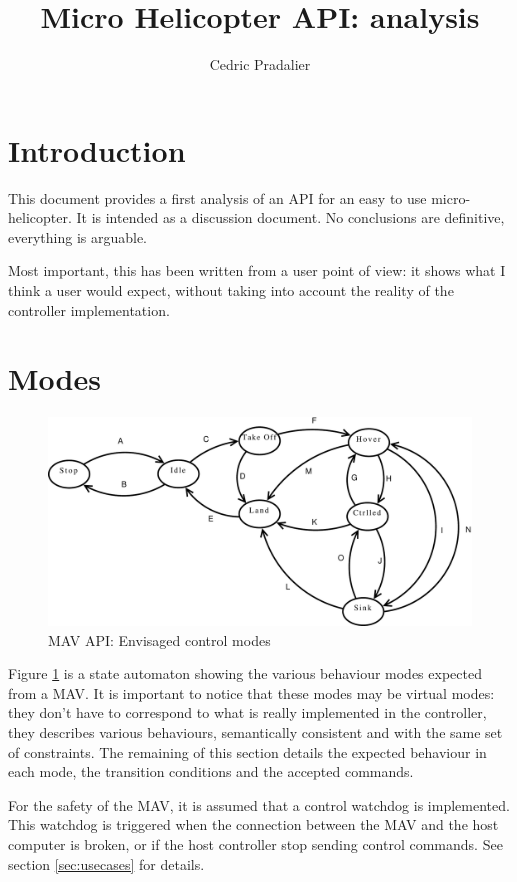 \documentclass{article}
\title{Micro Helicopter API: analysis}
\author{Cedric Pradalier}
\begin{document}
\maketitle

\section{Introduction}
\label{sec:intro}
This document provides a first analysis of an API for an easy to use
micro-helicopter. It is intended as a discussion document. No conclusions are
definitive, everything is arguable. 

Most important, this has been written from a user point of view: it shows what
I think a user would expect, without taking into account the reality of the
controller implementation. 

\section{Modes}
\label{sec:modes}
\begin{figure}[htb]
\centering
\includegraphics[width=0.9\columnwidth]{API_automaton}
\caption{MAV API: Envisaged control modes}
\label{fig:automaton}
\end{figure}
Figure \ref{fig:automaton} is a state automaton showing the various behaviour
modes expected from a MAV. It is important to notice that these modes may be
virtual modes: they don't have to correspond to what is really implemented in
the controller, they describes various behaviours, semantically consistent and
with the same set of constraints. The remaining of this section details the
expected behaviour in each mode, the transition conditions and the accepted
commands.

For the safety of the MAV, it is assumed that a control watchdog is
implemented. This watchdog is triggered when the connection between the MAV and
the host computer is broken, or if the host controller stop sending control
commands. See section \ref{sec:usecases} for details.
\end{document}
